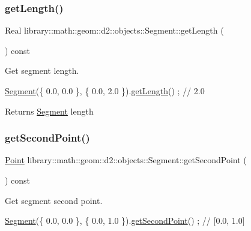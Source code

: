 \subsubsection{\texorpdfstring{get\+Length()}{getLength()}}
{\footnotesize\ttfamily Real library\+::math\+::geom\+::d2\+::objects\+::\+Segment\+::get\+Length (\begin{DoxyParamCaption}{ }\end{DoxyParamCaption}) const}



Get segment length. 


\begin{DoxyCode}
\hyperlink{classlibrary_1_1math_1_1geom_1_1d2_1_1objects_1_1_segment_a44ba44fd5f02a02fe34c40223b38fa8f}{Segment}(\{ 0.0, 0.0 \}, \{ 0.0, 2.0 \}).\hyperlink{classlibrary_1_1math_1_1geom_1_1d2_1_1objects_1_1_segment_a19ed354dd888d7581f14a8217c2af4a5}{getLength}() ; \textcolor{comment}{// 2.0}
\end{DoxyCode}


\begin{DoxyReturn}{Returns}
\hyperlink{classlibrary_1_1math_1_1geom_1_1d2_1_1objects_1_1_segment}{Segment} length 
\end{DoxyReturn}
\mbox{\label{classlibrary_1_1math_1_1geom_1_1d2_1_1objects_1_1_segment_acf79cfdb28dec7d497382a3ea650491c}} 
\subsubsection{\texorpdfstring{get\+Second\+Point()}{getSecondPoint()}}
{\footnotesize\ttfamily \hyperlink{classlibrary_1_1math_1_1geom_1_1d2_1_1objects_1_1_point}{Point} library\+::math\+::geom\+::d2\+::objects\+::\+Segment\+::get\+Second\+Point (\begin{DoxyParamCaption}{ }\end{DoxyParamCaption}) const}



Get segment second point. 


\begin{DoxyCode}
\hyperlink{classlibrary_1_1math_1_1geom_1_1d2_1_1objects_1_1_segment_a44ba44fd5f02a02fe34c40223b38fa8f}{Segment}(\{ 0.0, 0.0 \}, \{ 0.0, 1.0 \}).\hyperlink{classlibrary_1_1math_1_1geom_1_1d2_1_1objects_1_1_segment_acf79cfdb28dec7d497382a3ea650491c}{getSecondPoint}() ; \textcolor{comment}{// [0.0, 1.0]}
\end{DoxyCode}


